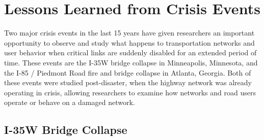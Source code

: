 \begin{table}

\caption{AEM Criticality Score \citet{aem2017}}
\label{tab:aemscore}
\end{table}

\section{Lessons Learned from Crisis Events}

Two major crisis events in the last 15 years have given researchers
an important opportunity
to observe and study what happens to transportation networks and user behavior when critical links are
suddenly disabled for an
extended period of time. These events are the I-35W bridge
collapse in
Minneapolis, Minnesota, and the I-85 / Piedmont Road fire and bridge
collapse in Atlanta, Georgia. Both of these events were studied post-disaster,
when the highway network was already operating in crisis, allowing researchers
to examine how networks and road users operate or behave on a damaged network.

\subsection{I-35W Bridge Collapse}

